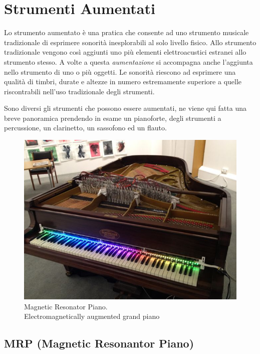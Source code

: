 
\chapter{Strumenti Aumentati}
\label{chp:strumentiaumentati}

Lo strumento aumentato è una pratica che consente ad uno strumento musicale
tradizionale di esprimere sonorità inesplorabili al solo livello fisico. Allo
strumento tradizionale vengono così aggiunti uno più elementi elettroacustici
estranei allo strumento stesso. A volte a questa \emph{aumentazione} si
accompagna anche l’aggiunta nello strumento di uno o più oggetti. Le sonorità
riescono ad esprimere una qualità di timbri, durate e altezze in numero
estremamente superiore a quelle riscontrabili nell’uso tradizionale degli
strumenti.

Sono diversi gli strumenti che possono essere aumentati, ne viene qui fatta una
breve panoramica prendendo in esame un pianoforte, degli strumenti a percussione,
un clarinetto, un sassofono ed un flauto.

\begin{figure}%
\centering
\includegraphics[width=0.99\columnwidth]{Graphics/foto/mrp-aberystwyth.jpg}
\caption[]{Magnetic Resonator Piano.\\ Electromagnetically augmented grand piano}
\label{mrp}
\end{figure}

\section{MRP (Magnetic Resonantor Piano)}

